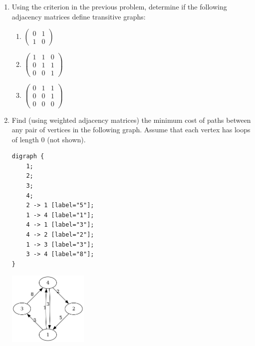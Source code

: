 \documentclass{amsart}
\begin{document}
\begin{enumerate}
\item Using the criterion in the previous problem, determine if the following adjacency matrices define transitive graphs:
\begin{enumerate}
\item \(\begin{pmatrix} 0 & 1 \\ 1 & 0 \end{pmatrix}\)
\item \(\begin{pmatrix} 1&1&0 \\ 0&1&1 \\ 0&0&1\end{pmatrix}\)
\item \(\begin{pmatrix} 0&1&1 \\ 0&0&1 \\ 0&0&0\end{pmatrix}\)
\end{enumerate}

\item Find (using weighted adjacency matrices) the minimum cost of paths between any pair of vertices in the following graph.
Assume that each vertex has loops of length 0 (not shown).
\begin{verbatim}
digraph {
    1;
    2;
    3;
    4;
    2 -> 1 [label="5"];
    1 -> 4 [label="1"];
    4 -> 1 [label="3"];
    4 -> 2 [label="2"];
    1 -> 3 [label="3"];
    3 -> 4 [label="8"];
}
\end{verbatim}
\begin{center}
\includegraphics[width=0.3\textwidth]{pa3-wadj.png}
\label{orge77fbb1}
\end{center}
\end{enumerate}
\end{document}
